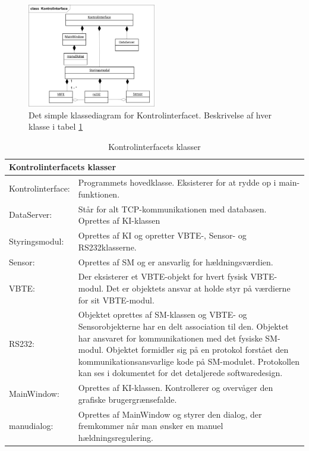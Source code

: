 \begin{figure}[htbp]
\centering
\includegraphics[width=0.5\textwidth]{billeder/KI/klassediagram_simpel}
\caption{Det simple klassediagram for Kontrolinterfacet. Beskrivelse af hver klasse i tabel \ref{tabel:ki-klasser}}
\label{fig:kd_simpel}
\end{figure}
 
\begin{table}[htbp]
\centering
{}
\begin{tabular}{| p{3cm}  p{12cm}|}
\multicolumn{2}{l}{{\Large Kontrolinterfacets klasser}} \\\hline
Kontrolinterface:&Programmets hovedklasse. Eksisterer for at rydde op i main-funktionen.\\\hline
DataServer:&Står for alt TCP-kommunikationen med databasen. Oprettes af KI-klassen\\\hline
Styringsmodul:&Oprettes af KI og opretter VBTE-, Sensor- og RS232klasserne.\\\hline
Sensor:&Oprettes af SM og er ansvarlig for hældningsværdien.\\\hline
VBTE:&Der eksisterer et VBTE-objekt for hvert fysisk VBTE-modul. Det er objektets ansvar at holde styr på værdierne for sit VBTE-modul.\\\hline
RS232:&Objektet oprettes af SM-klassen og VBTE- og Sensorobjekterne har en delt association til den. Objektet har ansvaret for kommunikationen med det fysiske SM-modul. Objektet formidler sig på en protokol forstået den kommunikationsansvarlige kode på SM-modulet. Protokollen kan ses i dokumentet for det detaljerede softwaredesign.\\\hline
MainWindow:&Oprettes af KI-klassen. Kontrollerer og overvåger den grafiske brugergrænsefalde.\\\hline
manudialog:&Oprettes af MainWindow og styrer den dialog, der fremkommer når man ønsker en manuel hældningsregulering.\\\hline
\end{tabular}
\caption{Kontrolinterfacets klasser}
\label{tabel:ki-klasser}
\end{table}

